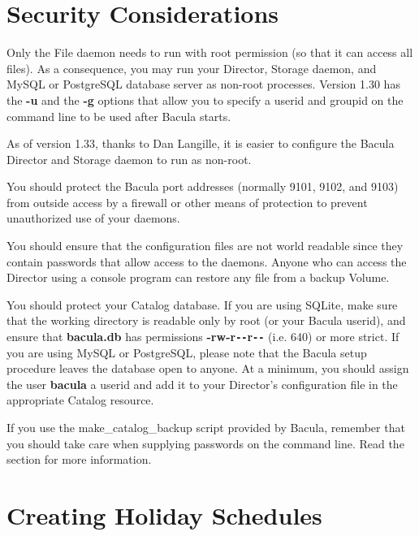 \section{Security Considerations}
\label{security}

Only the File daemon needs to run with root permission (so that it can access
all files). As a consequence, you may run your Director, Storage daemon, and
MySQL or PostgreSQL database server as non-root processes. Version 1.30 has
the {\bf -u} and the {\bf -g} options that allow you to specify a userid and
groupid on the command line to be used after Bacula starts. 

As of version 1.33, thanks to Dan Langille, it is easier to configure the
Bacula Director and Storage daemon to run as non-root. 

You should protect the Bacula port addresses (normally 9101, 9102, and 9103)
from outside access by a firewall or other means of protection to prevent
unauthorized use of your daemons. 

You should ensure that the configuration files are not world readable since
they contain passwords that allow access to the daemons. Anyone who can access
the Director using a console program can restore any file from a backup
Volume. 

You should protect your Catalog database. If you are using SQLite, make sure
that the working directory is readable only by root (or your Bacula userid),
and ensure that {\bf bacula.db} has permissions {\bf -rw-r\verb:--:r\verb:--:} (i.e. 640) or
more strict. If you are using MySQL or PostgreSQL, please note that the Bacula
setup procedure leaves the database open to anyone. At a minimum, you should
assign the user {\bf bacula} a userid and add it to your Director's
configuration file in the appropriate Catalog resource. 

If you use the make\_catalog\_backup script provided by Bacula, remember that
you should take care when supplying passwords on the command line.  Read the
section for more information.

\section{Creating Holiday Schedules}
\label{holiday}

